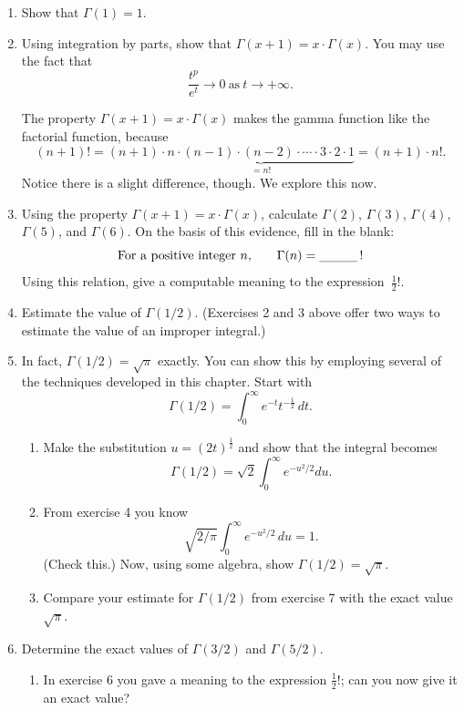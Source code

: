 \begin{enumerate}
\item Show that $\Gamma(1) = 1$.


\item Using integration by parts, show that
$\Gamma(x + 1) = x \cdot \Gamma(x)$.  You may use the fact that
	\[
\dfrac{t^p}{e^t} \to 0 \ \mbox{as} \ t \to +\infty.
\]



The property $\Gamma(x + 1) = x \cdot \Gamma(x)$ makes the gamma
function like the factorial function, because
	\[
(n+1)! = (n+1) \cdot 
		\underbrace{n \cdot (n-1) \cdot (n-2) \cdot 
			\cdots \cdot 3 \cdot 2 \cdot 1}_
		{\displaystyle = n!}
		= (n+1) \cdot n!.
\]
Notice there is a slight difference, though.  We explore this now.


\item Using the property $\Gamma(x + 1) = x \cdot \Gamma(x)$, calculate
$\Gamma(2)$, $\Gamma(3)$, $\Gamma(4)$, $\Gamma(5)$, and $\Gamma(6)$.
On the basis of this evidence, fill in the blank:
	\[
\mbox{For a positive integer $n$,} \qquad
		\Gamma(n) = \rule[-2pt]{30pt}{.3pt}\, !
\]
Using this relation, give a computable meaning to the
expression~$\tfrac{1}{2}!$.



\item Estimate the value of $\Gamma(1/2)$.  (Exercises 2 and 3 above
offer two ways to estimate the value of an improper integral.)


\item In fact, $\Gamma(1/2) = \sqrt{\pi}$ exactly.  You can show this
by employing several of the techniques developed in this chapter.
Start with
	\[
\Gamma(1/2) = 
		\int_0^{\infty} e^{-t} t^{-\frac{1}{2}} \, dt.
\]


  \begin{enumerate}
  \item Make the substitution $u = (2t)^{\tfrac{1}{2}}$ and show that the
integral becomes
	\[
\Gamma(1/2) = 
		\sqrt{2} \int_0^{\infty} e^{-u^2/2} du.
\]


  \item From exercise 4 you know
	\[
\sqrt{2/\pi} \int_{0}^{\infty}
		e^{-u^2/2} \, du = 1.
\]
(Check this.)  Now, using some algebra, show $\Gamma(1/2) = \sqrt{\pi}$.

  \item Compare your estimate for $\Gamma(1/2)$ from exercise 7 with the
exact value $\sqrt{\pi}$.


\end{enumerate}
\item Determine the exact values of $\Gamma(3/2)$ and $\Gamma(5/2)$.

  \begin{enumerate}
  \item In exercise 6 you gave a meaning to the expression
$\tfrac{1}{2}!$; can you now give it an exact value?


\end{enumerate}
\end{enumerate}
